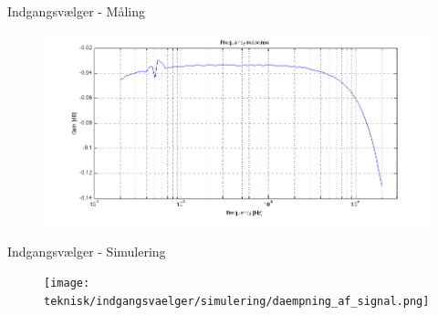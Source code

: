 \begin{frame}{Indgangsvælger - Måling}
\begin{figure}[h]
\centering
\includegraphics[width=\textwidth]{../rapport/maalerapporter/indgangsvaelger/Indgangsvlger-mic-200mv-frek.png}
\label{fig:indacc:frek200mv}
\end{figure}
\end{frame}

\begin{frame}{Indgangsvælger - Simulering}
\begin{figure}[h]
\centering
\texttt{[image: teknisk/indgangsvaelger/simulering/daempning\_af\_signal.png]}
\label{indgangsvaelger_daempniing}
\end{figure}
\end{frame}


